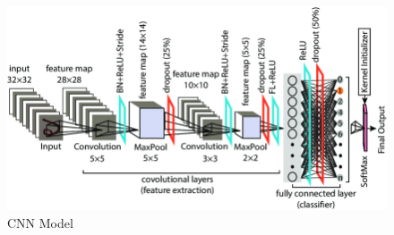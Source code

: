 \documentclass[12pt,a4paper]{article}
\begin{document}
\begin{figure}[h]
	\centering
	\includegraphics[width=\textwidth]{model.png}
	\caption{CNN Model}
	\label{fig:grafik}
\end{figure}

				
				
				
				
				
	
	
	\pagebreak
\end{document}
